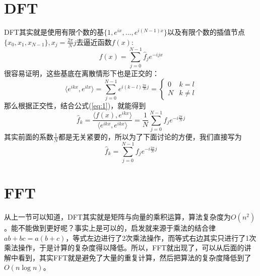 \documentclass[11pt]{article}
\begin{document}
\section{DFT}
DFT其实就是使用有限个数的基$\{1, e^{ix}, ..., e^{i(N-1)x}\}$以及有限个数的插值节点$\{x_0, x_1, x_{N-1}\}, x_j=\frac{2\pi}{N}j$去逼近函数$f(x)$:
\begin{equation}\label{eq:1}
f(x) = \sum_{j=0}^{N-1}\hat{f}_je^{-ijx}
\end{equation}
很容易证明，这些基底在离散情形下也是正交的：
\begin{equation}
\langle e^{ikx}, e^{ilx}\rangle = \sum_{j=0}^{N-1}e^{i(k-l)\frac{2\pi}{N}j}=\begin{cases}
0 & k = l\\
N & k\neq l
\end{cases}
\end{equation}
那么根据正交性，结合公式(\ref{eq:1})，就能得到
\begin{equation}
\hat{f}_k = \frac{\langle f(x), e^{ikx}\rangle}{\langle e^{ikx}, e^{ikx} \rangle} = \frac{1}{N}\sum_{j=0}^{N-1}f_je^{-i\frac{2\pi}{N}j}
\end{equation}
其实前面的系数$\frac{1}{N}$都是无关紧要的，所以为了下面讨论的方便，我们直接写为
\begin{equation}
\hat{f}_k = \sum_{j=0}^{N-1}f_je^{-i\frac{2\pi}{N}j}
\end{equation}
\section{FFT}
从上一节可以知道，DFT其实就是矩阵与向量的乘积运算，算法复杂度为$O(n^2)$。能不能做到更好呢？事实上是可以的，启发就来源于乘法的结合律$ab + bc = a(b + c)$，等式左边进行了2次乘法操作，而等式右边其实只进行了1次乘法操作，于是计算的复杂度得以降低。所以，FFT就出现了，可以从后面的讲解中看到，其实FFT就是避免了大量的重复计算，然后把算法的复杂度降低到了$O(n\log n)$。
\end{document}
